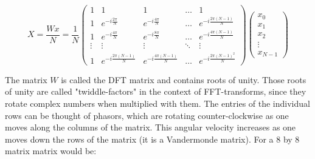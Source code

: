 \documentclass[english,11pt,a4paper,table]{article} %
\begin{document}
\begin{equation}
	\label{eq:dft-matrix}
	X = \frac{W x}{N}= \frac{1}{N} \begin{pmatrix}
		1 & 1 & 1 & \dots & 1 \\
		1 & e^{-i \frac{2 \pi}{N}} & e^{-i \frac{4 \pi}{N}} & \dots & e^{-i \frac{2 \pi (N-1)}{N}} \\
		1 & e^{-i \frac{4 \pi}{N}} & e^{-i \frac{8 \pi}{N}} & \dots & e^{-i \frac{4 \pi (N-1)}{N}} \\
		\vdots & \vdots & \vdots & \ddots & \vdots \\
		1 & e^{-i \frac{2 \pi (N-1)}{N}} & e^{-i \frac{4 \pi (N-1)}{N}} & \dots & e^{-i \frac{2 \pi (N-1)^2}{N}}
	\end{pmatrix}
	\begin{pmatrix}
		x_0 \\
		x_1 \\
		x_2 \\
		\vdots \\
		x_{N-1}
	\end{pmatrix}
\end{equation}

The matrix $W$ is called the DFT matrix and contains roots of unity.
Those roots of unity are called "twiddle-factors" in the context of FFT-transforms, since they rotate complex numbers when multiplied with them.
The entries of the individual rows can be thought of phasors, which are rotating counter-clockwise as one moves along the columns of the matrix.
This angular velocity increases as one moves down the rows of the matrix (it is a Vandermonde matrix).
For a 8 by 8 matrix matrix would be:
\end{document}
